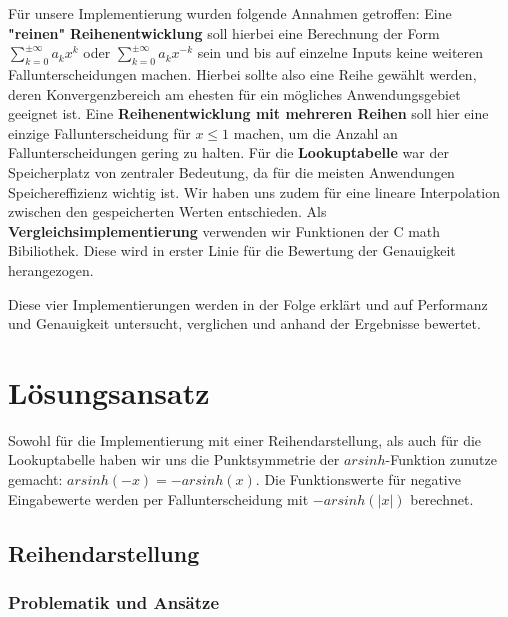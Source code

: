 \documentclass[course=erap] {aspdoc}
\begin{document}
    Für unsere Implementierung wurden folgende Annahmen getroffen:
    Eine \textbf{"reinen"} \textbf{Reihenentwicklung} soll hierbei eine Berechnung der Form $\sum_{k=0}^{\pm\infty} a_k x^k$ oder $\sum_{k=0}^{\pm\infty} a_k x^{-k}$ sein und bis auf einzelne Inputs keine weiteren Fallunterscheidungen machen.
    Hierbei sollte also eine Reihe gewählt werden, deren Konvergenzbereich am ehesten für ein mögliches Anwendungsgebiet geeignet ist.
    Eine \textbf{Reihenentwicklung mit mehreren Reihen} soll hier eine einzige Fallunterscheidung für $x\leq1$ machen, um die Anzahl an Fallunterscheidungen gering zu halten.
    Für die \textbf{Lookuptabelle} war der Speicherplatz von zentraler Bedeutung, da für die meisten Anwendungen Speichereffizienz wichtig ist.
    Wir haben uns zudem für eine lineare Interpolation zwischen den gespeicherten Werten entschieden.
    Als \textbf{Vergleichsimplementierung} verwenden wir Funktionen der C math Bibiliothek.
    Diese wird in erster Linie für die Bewertung der Genauigkeit herangezogen.

    Diese vier Implementierungen werden in der Folge erklärt und auf Performanz und Genauigkeit untersucht, verglichen und anhand der Ergebnisse bewertet.


    \section{Lösungsansatz}

    Sowohl für die Implementierung mit einer Reihendarstellung, als auch für die Lookuptabelle haben wir uns die Punktsymmetrie der $arsinh$-Funktion zunutze gemacht: $arsinh(-x) = -arsinh(x)$.
    Die Funktionswerte für negative Eingabewerte werden per Fallunterscheidung mit $-arsinh(|x|)$ berechnet.


    \subsection{ Reihendarstellung}

    \subsubsection{Problematik und Ansätze}
\end{document}
